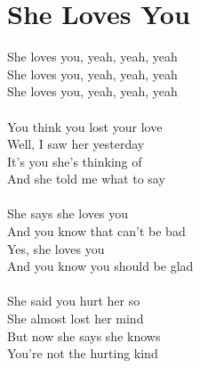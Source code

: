 \section{She Loves You}
\begin{multicols}{2}
She loves you, yeah, yeah, yeah\\
She loves you, yeah, yeah, yeah\\
She loves you, yeah, yeah, yeah\\
\\
You think you lost your love\\
Well, I saw her yesterday\\
It's you she's thinking of\\
And she told me what to say\\
\\
She says she loves you\\
And you know that can't be bad\\
Yes, she loves you\\
And you know you should be glad\\
\\
She said you hurt her so\\
She almost lost her mind\\
But now she says she knows\\
You're not the hurting kind\\


\end{multicols}
